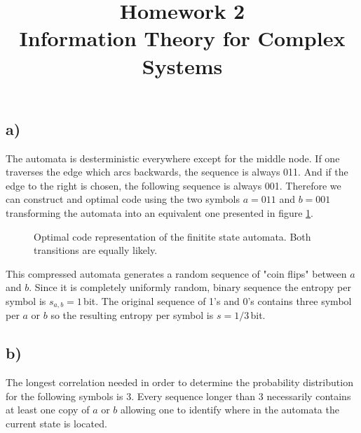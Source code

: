 \documentclass[a4paper, 12pt]{article}
\begin{document}
\title{\vspace{-6em}\textbf{Homework 2}\\ \Large Information Theory for Complex Systems \vspace{-1em}}
\author{}
\date{\vspace{-3.2em}}

\maketitle

\subsection*{a)}
The automata is desterministic everywhere except for the middle node. If one traverses the edge which arcs backwards, the sequence is always 011. And if the edge to the right is chosen, the following sequence is always 001. Therefore we can construct and optimal code using the two symbols $a = 011$ and $b = 001$ transforming the automata into an equivalent one presented in figure \ref{fig:code}.

\begin{figure}[ht]
\begin{center}
    \caption{Optimal code representation of the finitite state automata. Both transitions are equally likely.}
    \label{fig:code}
\end{center}

\end{figure}

This compressed automata generates a random sequence of "coin flips" between $a$ and $b$. Since it is completely uniformly random, binary sequence the entropy per symbol is $s_{a,b} = 1\,$bit. The original sequence of 1's and 0's contains three symbol per $a$ or $b$ so the resulting entropy per symbol is $s = 1/3\,$bit.

\subsection*{b)}
The longest correlation needed in order to determine the probability distribution for the following symbols is 3. Every sequence longer than 3 necessarily contains at least one copy of $a$ or $b$ allowing one to identify where in the automata the current state is located.
\end{document}
